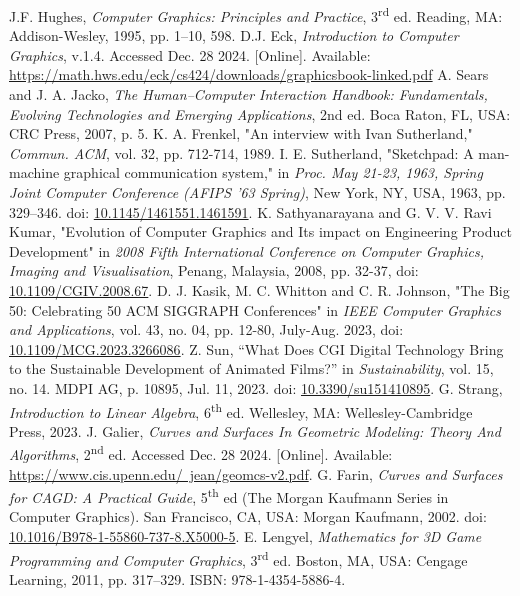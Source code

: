 \documentclass[conference]{IEEEtran}
\begin{document}
\begin{thebibliography}{00}
 J.F. Hughes, \textit{Computer Graphics: Principles and Practice}, 3\textsuperscript{rd} ed. Reading, MA: Addison-Wesley, 1995, pp. 1--10, 598.
 D.J. Eck, \textit{Introduction to Computer Graphics}, v.1.4. Accessed Dec. 28 2024. [Online]. Available: \href{https://math.hws.edu/eck/cs424/downloads/graphicsbook-linked.pdf}{https://math.hws.edu/eck/cs424/downloads/graphicsbook-linked.pdf}
 A. Sears and J. A. Jacko, \textit{The Human–Computer Interaction Handbook: Fundamentals, Evolving Technologies and Emerging Applications}, 2nd ed. Boca Raton, FL, USA: CRC Press, 2007, p. 5.
  K. A. Frenkel, "An interview with Ivan Sutherland," \textit{Commun. ACM}, vol. 32, pp. 712-714, 1989.
 I. E. Sutherland, "Sketchpad: A man-machine graphical communication system," in \textit{Proc. May 21-23, 1963, Spring Joint Computer Conference (AFIPS '63 Spring)}, New York, NY, USA, 1963, pp. 329–346. doi: \href{https://doi.org/10.1145/1461551.1461591}{10.1145/1461551.1461591}.
 K. Sathyanarayana and G. V. V. Ravi Kumar, "Evolution of Computer Graphics and Its impact on Engineering Product Development" in \textit{2008 Fifth International Conference on Computer Graphics, Imaging and Visualisation}, Penang, Malaysia, 2008, pp. 32-37, doi: \href{https://ieeexplore.ieee.org/stamp/stamp.jsp?tp=&arnumber=4626981}{10.1109/CGIV.2008.67}.
 D. J. Kasik, M. C. Whitton and C. R. Johnson, "The Big 50: Celebrating 50 ACM SIGGRAPH Conferences" in \textit{IEEE Computer Graphics and Applications}, vol. 43, no. 04, pp. 12-80, July-Aug. 2023, doi: \href{https://doi.ieeecomputersociety.org/10.1109/MCG.2023.3266086}{10.1109/MCG.2023.3266086}.
 Z. Sun, “What Does CGI Digital Technology Bring to the Sustainable Development of Animated Films?” in \textit{Sustainability}, vol. 15, no. 14. MDPI AG, p. 10895, Jul. 11, 2023. doi: \href{https://www.mdpi.com/2071-1050/15/14/10895}{10.3390/su151410895}.
 G. Strang, \textit{Introduction to Linear Algebra}, 6\textsuperscript{th} ed. Wellesley, MA: Wellesley-Cambridge Press, 2023.
 J. Galier, \textit{Curves and Surfaces In Geometric Modeling: Theory And Algorithms}, 2\textsuperscript{nd} ed. Accessed Dec. 28 2024. [Online]. Available: \href{https://www.cis.upenn.edu/~jean/geomcs-v2.pdf}{https://www.cis.upenn.edu/~jean/geomcs-v2.pdf}.
 G. Farin, \textit{Curves and Surfaces for CAGD: A Practical Guide}, 5\textsuperscript{th} ed (The Morgan Kaufmann Series in Computer Graphics). San Francisco, CA, USA: Morgan Kaufmann, 2002. doi: \href{https://www.sciencedirect.com/book/9781558607378/curves-and-surfaces-for-cagd}{10.1016/B978-1-55860-737-8.X5000-5}.
 E. Lengyel, \textit{Mathematics for 3D Game Programming and Computer Graphics}, 3\textsuperscript{rd} ed. Boston, MA, USA: Cengage Learning, 2011, pp. 317--329. ISBN: 978-1-4354-5886-4.
\end{thebibliography}
\end{document}
